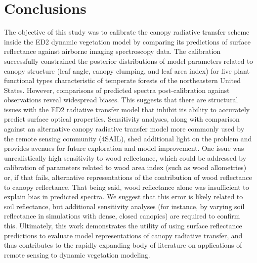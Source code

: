 \section{Conclusions}

The objective of this study was to calibrate the canopy radiative transfer scheme inside the ED2 dynamic vegetation model by comparing its predictions of surface reflectance against airborne imaging spectroscopy data.
The calibration successfully constrained the posterior distributions of model parameters related to canopy structure (leaf angle, canopy clumping, and leaf area index) for five plant functional types characteristic of temperate forests of the northeastern United States.  
However, comparisons of predicted spectra post-calibration against observations reveal widespread biases.
This suggests that there are structural issues with the ED2 radiative transfer model that inhibit its ability to accurately predict surface optical properties.
Sensitivity analyses, along with comparison against an alternative canopy radiative transfer model more commonly used by the remote sensing community (4SAIL), shed additional light on the problem and provides avenues for future exploration and model improvement.
One issue was unrealistically high sensitivity to wood reflectance, which could be addressed by calibration of parameters related to wood area index (such as wood allometries) or, if that fails, alternative representations of the contribution of wood reflectance to canopy reflectance.
That being said, wood reflectance alone was insufficient to explain bias in predicted spectra.\@
We suggest that this error is likely related to soil reflectance, but additional sensitivity analyses (for instance, by varying soil reflectance in simulations with dense, closed canopies) are required to confirm this.
Ultimately, this work demonstrates the utility of using surface reflectance predictions to evaluate model representations of canopy radiative transfer, and thus contributes to the rapidly expanding body of literature on applications of remote sensing to dynamic vegetation modeling.
